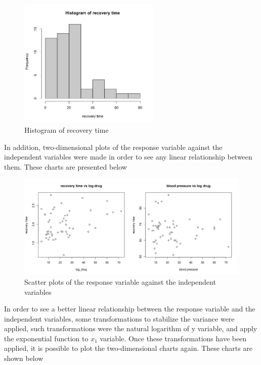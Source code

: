 \documentclass{article}
\begin{document}
\begin{figure}[H]
\centering
\includegraphics[width=0.6\textwidth]{hrt.png}
\caption{\label{fig:frog} Histogram of recovery time}
\end{figure}

In addition, two-dimensional plots of the response variable against the independent variables were made in order to see any linear relationship between them. These charts are presented below

\begin{figure}[H]
\centering
\includegraphics[width=1\textwidth]{evsr.png}
\caption{\label{fig:frog} Scatter plots of the response variable against the independent variables}
\end{figure}

In order to see a better linear relationship between the response variable and the independent variables, some transformations to stabilize the variance were applied, such transformations were the natural logarithm of y variable, and apply the exponential function to \(x_1\) variable. Once these transformations have been applied, it is possible to plot the two-dimensional charts again. These charts are shown below
\end{document}
